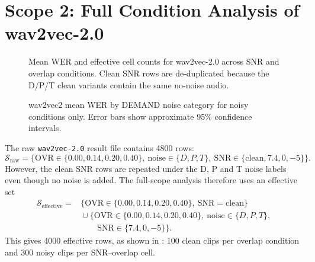 \section{Scope 2: Full Condition Analysis of wav2vec-2.0}

\begin{figure}[htbp]
    \centering
    \caption{Mean WER and effective cell counts for wav2vec-2.0 across SNR and overlap conditions. Clean SNR rows are de-duplicated because the D/P/T clean variants contain the same no-noise audio.}
    \label{fig:stat_wav2vec2_snr_overlap_heatmap}
\end{figure}

\begin{figure}[htbp]
    \centering
    \caption{wav2vec2 mean WER by DEMAND noise category for noisy conditions only. Error bars show approximate 95\% confidence intervals.}
    \label{fig:stat_wav2vec2_noise}
\end{figure}

The raw \texttt{wav2vec-2.0} result file contains 4800 rows:
\begin{equation}
    \mathcal{S}_{\mathrm{raw}} = \{\mathrm{OVR}\in\{0.00,0.14,0.20,0.40\},\ \mathrm{noise}\in\{D, P, T\},\ \mathrm{SNR}\in\{\mathrm{clean},7.4,0,-5\}\}.
\end{equation}
However, the clean SNR rows are repeated under the D, P and T noise labels even though no noise is added. The full-scope analysis therefore uses an effective set
\begin{equation}
\begin{aligned}
    \mathcal{S}_{\mathrm{effective}} ={}&
    \{\mathrm{OVR}\in\{0.00,0.14,0.20,0.40\},\ \mathrm{SNR}=\mathrm{clean}\} \\
    &{}\cup
    \{\mathrm{OVR}\in\{0.00,0.14,0.20,0.40\},\ \mathrm{noise}\in\{D,P,T\},\\
    &\qquad \mathrm{SNR}\in\{7.4,0,-5\}\}.
\end{aligned}
\end{equation}
This gives 4000 effective rows, as shown in : 100 clean clips per overlap condition and 300 noisy clips per SNR--overlap cell.

